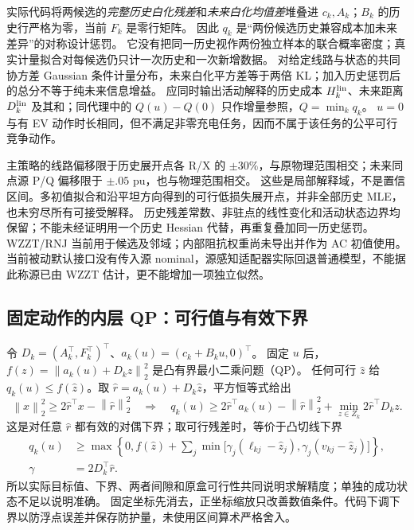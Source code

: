 \documentclass[UTF8,fontset=fandol,11pt,a4paper]{ctexart}
\newcommand{\norm}[1]{\left\lVert#1\right\rVert}
\begin{document}
实际代码将两候选的\emph{完整历史白化残差}和\emph{未来白化均值差}堆叠进 $c_k,A_k$；$B_k$ 的历史行严格为零，当前 $F_k$ 是零行矩阵。
因此 $q_k$ 是“两份候选历史兼容成本加未来差异”的对称设计惩罚。
它没有把同一历史视作两份独立样本的联合概率密度；真实计量拟合对每候选仍只计一次历史和一次新增数据。
对给定线路与状态的共同协方差 Gaussian 条件计量分布，未来白化平方差等于两倍 KL；加入历史惩罚后的总分不等于纯未来信息增益。
应同时输出活动解释的历史成本 $H_k^{\rm lin}$、未来距离 $D_k^{\rm lin}$ 及其和；同代理中的 $Q(u)-Q(0)$ 只作增量参照，$Q=\min_kq_k$。
$u=0$ 与有 EV 动作时长相同，但不满足非零充电任务，因而不属于该任务的公平可行竞争动作。

主策略的线路偏移限于历史展开点各 R/X 的 $\pm30\%$，与原物理范围相交；未来同点源 P/Q 偏移限于 $\pm.05$ pu，也与物理范围相交。
这些是局部解释域，不是置信区间。多初值拟合和沿平坦方向得到的可行低损失展开点，并非全部历史 MLE，也未穷尽所有可接受解释。
历史残差常数、非驻点的线性变化和活动状态边界均保留；不能未经证明用一个历史 Hessian 代替，再重复叠加同一历史惩罚。
WZZT/RNJ 当前用于候选及邻域；内部阻抗权重尚未导出并作为 AC 初值使用。当前被动默认接口没有传入源 nominal，源感知适配器实际回退普通模型，不能据此称源已由 WZZT 估计，更不能增加一项独立似然。

\subsection{固定动作的内层 QP：可行值与有效下界}
令 $D_k=(A_k^\top,F_k^\top)^\top$、$a_k(u)=(c_k+B_ku,0)^\top$。
固定 $u$ 后，$f(z)=\norm{a_k(u)+D_kz}_2^2$ 是凸有界最小二乘问题（QP）。
任何可行 $\widehat z$ 给 $q_k(u)\le f(\widehat z)$。取 $\widehat r=a_k(u)+D_k\widehat z$，平方恒等式给出
\begin{equation}
 \norm{x}_2^2\ge2\widehat r^\top x-\norm{\widehat r}_2^2
 \quad\Longrightarrow\quad
 q_k(u)\ge 2\widehat r^\top a_k(u)-\norm{\widehat r}_2^2
       +\min_{z\in Z_k}2\widehat r^\top D_kz .
 \label{eq:adapt-qpdual}
\end{equation}
这是对任意 $\widehat r$ 都有效的对偶下界；取可行残差时，等价于凸切线下界
\begin{equation}
 \begin{aligned}
 q_k(u)&\ge\max\!\left\{0,
 f(\widehat z)+\sum_j\min\bigl[\gamma_j(\ell_{kj}-\widehat z_j),
                       \gamma_j(v_{kj}-\widehat z_j)\bigr]\right\},\\
 \gamma&=2D_k^\top\widehat r .
 \end{aligned}
 \label{eq:adapt-qpgap}
\end{equation}
所以实际目标值、下界、两者间隙和原盒可行性共同说明求解精度；单独的成功状态不足以说明准确。
固定坐标先消去，正坐标缩放只改善数值条件。代码下调下界以防浮点误差并保存防护量，未使用区间算术严格舍入。
\end{document}
